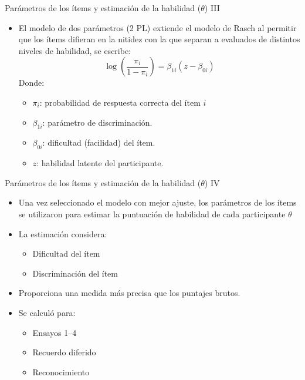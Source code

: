 \documentclass[aspectratio=169]{beamer}
\begin{document}
\begin{frame}{Parámetros de los ítems y estimación de la habilidad ($\theta$) III}
	\begin{itemize}
		\item El modelo de dos parámetros (2 PL)  extiende el modelo de Rasch al permitir que los ítems difieran en la nitidez con la que separan a evaluados de distintos niveles de habilidad, se escribe:
		\[ \log\left(\frac{\pi_i}{1-\pi_i}\right)=\beta_{1i}(z-\beta_{0i})\]
		Donde:
		\begin{itemize} 
			\item $\pi_i$: probabilidad de respuesta correcta del ítem $i$
			\item $\beta_{1i}$: parámetro de discriminación.
			\item $\beta_{0i}$: dificultad (facilidad) del ítem. 
			\item $z$: habilidad latente del participante. 
		\end{itemize}
	\end{itemize}
\end{frame}

\begin{frame}{Parámetros de los ítems y estimación de la habilidad ($\theta$) IV}
	\begin{itemize}
		\item Una vez seleccionado el modelo con mejor ajuste, los parámetros de los ítems se utilizaron para estimar la puntuación de habilidad de cada participante $\theta$\\
		\vspace{10pt}
		\item La estimación considera:
		\begin{itemize}
			 \item Dificultad del ítem 
			 \item Discriminación del ítem 
		\end{itemize}
		\vspace{10pt}
		\item Proporciona una medida más precisa que los puntajes brutos. 
		\vspace{10pt}
		\item Se calculó para: 
		\begin{itemize} 
			\item Ensayos 1--4 
			\item Recuerdo diferido 
			\item Reconocimiento 
		\end{itemize}
	\end{itemize}
\end{frame}
\end{document}

